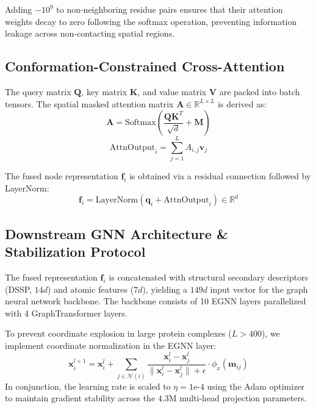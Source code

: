 \documentclass[10pt,journal,compsoc]{IEEEtran}
\begin{document}
Adding $-10^9$ to non-neighboring residue pairs ensures that their attention weights decay to zero following the softmax operation, preventing information leakage across non-contacting spatial regions.

\subsection{Conformation-Constrained Cross-Attention}
The query matrix $\mathbf{Q}$, key matrix $\mathbf{K}$, and value matrix $\mathbf{V}$ are packed into batch tensors. The spatial masked attention matrix $\mathbf{A} \in \mathbb{R}^{L \times L}$ is derived as:
\begin{equation}
\mathbf{A} = \text{Softmax}\left( \frac{\mathbf{Q} \mathbf{K}^T}{\sqrt{d}} + \mathbf{M} \right)
\end{equation}
\begin{equation}
\text{AttnOutput}_i = \sum_{j=1}^L A_{i, j} \mathbf{v}_j
\end{equation}

The fused node representation $\mathbf{f}_i$ is obtained via a residual connection followed by LayerNorm:
\begin{equation}
\mathbf{f}_i = \text{LayerNorm}(\mathbf{q}_i + \text{AttnOutput}_i) \in \mathbb{R}^d
\end{equation}

\subsection{Downstream GNN Architecture \& Stabilization Protocol}
The fused representation $\mathbf{f}_i$ is concatenated with structural secondary descriptors (DSSP, $14d$) and atomic features ($7d$), yielding a $149d$ input vector for the graph neural network backbone. The backbone consists of 10 EGNN layers parallelized with 4 GraphTransformer layers.

To prevent coordinate explosion in large protein complexes ($L > 400$), we implement coordinate normalization in the EGNN layer:
\begin{equation}
\mathbf{x}_i^{l+1} = \mathbf{x}_i^l + \sum_{j \in \mathcal{N}(i)} \frac{\mathbf{x}_i^l - \mathbf{x}_j^l}{\|\mathbf{x}_i^l - \mathbf{x}_j^l\| + \epsilon} \cdot \phi_x(\mathbf{m}_{ij})
\end{equation}
In conjunction, the learning rate is scaled to $\eta = 1\text{e-}4$ using the Adam optimizer to maintain gradient stability across the $4.3\text{M}$ multi-head projection parameters.
\end{document}
